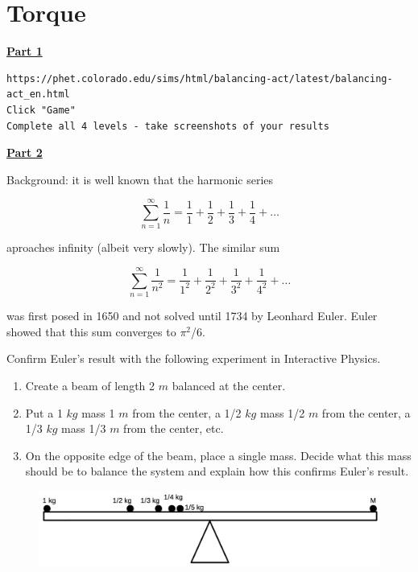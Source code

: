 \section{Torque}

\underline{\textbf{Part 1}} \par

\begin{verbatim}
https://phet.colorado.edu/sims/html/balancing-act/latest/balancing-act_en.html
Click "Game"
Complete all 4 levels - take screenshots of your results
\end{verbatim}

\underline{\textbf{Part 2}} \par

Background: it is well known that the harmonic series

\begin{equation}
\sum_{n=1}^{\infty} \frac{1}{n} = \frac{1}{1} + \frac{1}{2} + \frac{1}{3} + \frac{1}{4} + \dots
\end{equation}

aproaches infinity (albeit very slowly).
The similar sum

\begin{equation}
\sum_{n=1}^{\infty} \frac{1}{n^2} = \frac{1}{1^2} + \frac{1}{2^2} + \frac{1}{3^2} + \frac{1}{4^2} + \dots
\end{equation}

was first posed in 1650 and not solved until 1734 by Leonhard Euler.
Euler showed that this sum converges to $\pi^2$/6.

\vspace{\baselineskip}

Confirm Euler's result with the following experiment in Interactive Physics.
\begin{enumerate}
\item Create a beam of length 2 $m$ balanced at the center.
\item Put a 1 $kg$ mass 1 $m$ from the center, a 1/2 $kg$ mass 1/2 $m$ from the center, a 1/3 $kg$ mass 1/3 $m$ from the center, etc.
\item On the opposite edge of the beam, place a single mass. Decide what this mass should be to balance the system and explain how this confirms Euler's result.
\end{enumerate}

\begin{figure}[H]
\includegraphics[scale=0.50]{figures/torque/fig1.png}
\end{figure}

\pagebreak \clearpage
